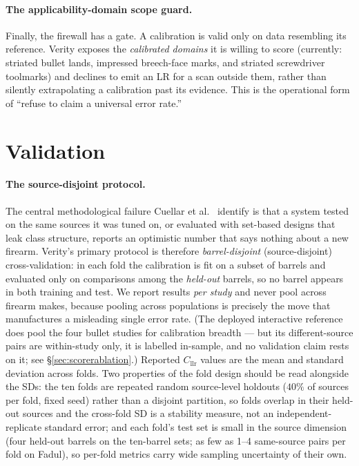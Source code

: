 \documentclass[11pt]{article}
\newcommand{\Cllr}{C_{\mathrm{llr}}}
\begin{document}
\paragraph{The applicability-domain scope guard.}
Finally, the firewall has a gate. A calibration is valid only on data resembling
its reference. Verity exposes the \emph{calibrated domains} it is willing to score
(currently: striated bullet lands, impressed breech-face marks, and striated
screwdriver toolmarks) and declines to
emit an LR for a scan outside them, rather than silently extrapolating a
calibration past its evidence. This is the operational form of ``refuse to claim a
universal error rate.''

\section{Validation}
\label{sec:validation}

\paragraph{The source-disjoint protocol.} The central methodological failure
Cuellar et al.~\cite{cuellar2024} identify is that a system tested on the same
sources it was tuned on, or evaluated with set-based designs that leak class
structure, reports an optimistic number that says nothing about a new firearm.
Verity's primary protocol is therefore \emph{barrel-disjoint} (source-disjoint)
cross-validation: in each fold the calibration is fit on a subset of barrels and
evaluated only on comparisons among the \emph{held-out} barrels, so no barrel
appears in both training and test. We report results \emph{per study} and never
pool across firearm makes, because pooling across populations is precisely the move
that manufactures a misleading single error rate. (The deployed interactive
reference does pool the four bullet studies for calibration breadth --- but its
different-source pairs are within-study only, it is labelled in-sample, and no
validation claim rests on it; see \S\ref{sec:scorerablation}.) Reported $\Cllr$
values are the mean and standard deviation across folds. Two properties of the
fold design should be read alongside the SDs: the ten folds are repeated random
source-level holdouts ($40\%$ of sources per fold, fixed seed) rather than a
disjoint partition, so folds overlap in their held-out sources and the cross-fold
SD is a stability measure, not an independent-replicate standard error; and each
fold's test set is small in the source dimension (four held-out barrels on the
ten-barrel sets; as few as 1--4 same-source pairs per fold on Fadul), so per-fold
metrics carry wide sampling uncertainty of their own.
\end{document}
